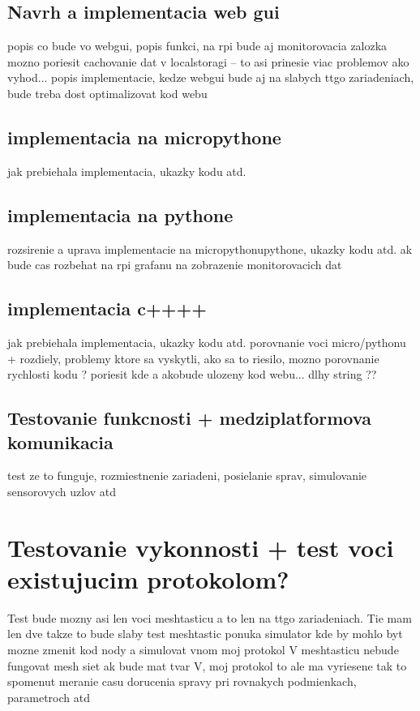 \documentclass[slovak,master]{diploma}
\begin{document}
\section{Navrh a implementacia web gui}
popis co bude vo webgui, popis funkci, na rpi bude aj monitorovacia zalozka
mozno poriesit cachovanie dat v localstoragi -- to asi prinesie viac problemov ako vyhod...
popis implementacie, kedze webgui bude aj na slabych ttgo zariadeniach, bude treba dost optimalizovat kod webu

\section{implementacia na micropythone}
jak prebiehala implementacia, ukazky kodu atd.

\section{implementacia na pythone}
rozsirenie a uprava implementacie na micropythonupythone, ukazky kodu atd.
ak bude cas rozbehat na rpi grafanu na zobrazenie monitorovacich dat

\section{implementacia c++++}
jak prebiehala implementacia, ukazky kodu atd.
porovnanie voci micro/pythonu + rozdiely, problemy ktore sa vyskytli, ako sa to riesilo, mozno porovnanie rychlosti kodu ?
poriesit kde a akobude ulozeny kod webu... dlhy string ??

\section{Testovanie funkcnosti + medziplatformova komunikacia}
test ze to funguje, rozmiestnenie zariadeni, posielanie sprav, simulovanie sensorovych uzlov atd

\chapter{Testovanie vykonnosti + test voci existujucim protokolom?}
Test bude mozny asi len voci meshtasticu a to len na ttgo zariadeniach. Tie mam len dve takze to bude slaby test
meshtastic ponuka simulator kde by mohlo byt mozne zmenit kod nody a simulovat vnom moj protokol
V meshtasticu nebude fungovat mesh siet ak bude mat tvar V, moj protokol to ale ma vyriesene tak to spomenut
meranie casu dorucenia spravy pri rovnakych podmienkach, parametroch atd
\end{document}
